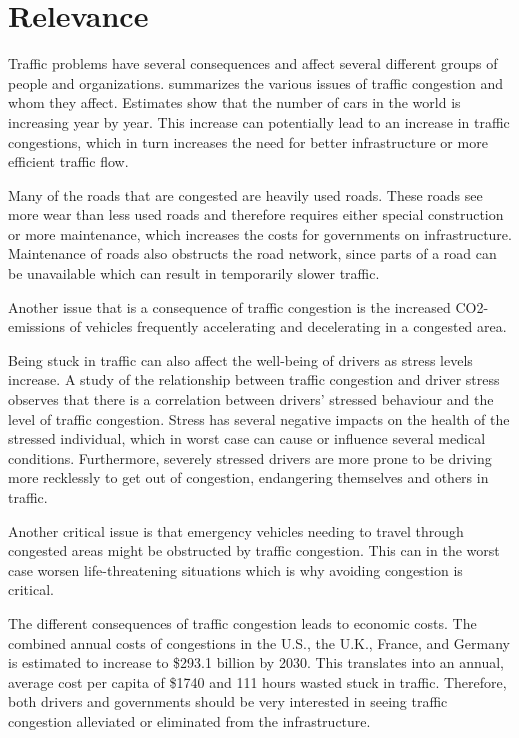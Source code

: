 \section{Relevance}
Traffic problems have several consequences and affect several different groups of people and organizations.  summarizes the various issues of traffic congestion and whom they affect. Estimates show that the number of cars in the world is increasing year by year\cite{WardsAuto:CarPopulation}. This increase can potentially lead to an increase in traffic congestions, which in turn increases the need for better infrastructure or more efficient traffic flow.

Many of the roads that are congested are heavily used roads. These roads see more wear than less used roads and therefore requires either special construction or more maintenance, which increases the costs for governments on infrastructure. Maintenance of roads also obstructs the road network, since parts of a road can be unavailable which can result in temporarily slower traffic.

Another issue that is a consequence of traffic congestion is the increased CO2-emissions of vehicles frequently accelerating and decelerating in a congested area\cite{BarthBoriboonsomsin2009}.

Being stuck in traffic can also affect the well-being of drivers as stress levels increase. A study of the relationship between traffic congestion and driver stress observes that there is a correlation between drivers' stressed behaviour and the level of traffic congestion\cite{HennesyWiesenthal1997,StokolsNovacoStokolsCampell1978}. Stress has several negative impacts on the health of the stressed individual, which in worst case can cause or influence several medical conditions. Furthermore, severely stressed drivers are more prone to be driving more recklessly to get out of congestion, endangering themselves and others in traffic\cite{Shinar1998}.

Another critical issue is that emergency vehicles needing to travel through congested areas might be obstructed by traffic congestion. This can in the worst case worsen life-threatening situations which is why avoiding congestion is critical.

The different consequences of traffic congestion leads to economic costs. The combined annual costs of congestions in the U.S., the U.K., France, and Germany is estimated to increase to \$293.1 billion by 2030\cite{INRIX2013}. This translates into an annual, average cost per capita of \$1740 and 111 hours wasted stuck in traffic. Therefore, both drivers and governments should be very interested in seeing traffic congestion alleviated or eliminated from the infrastructure.

